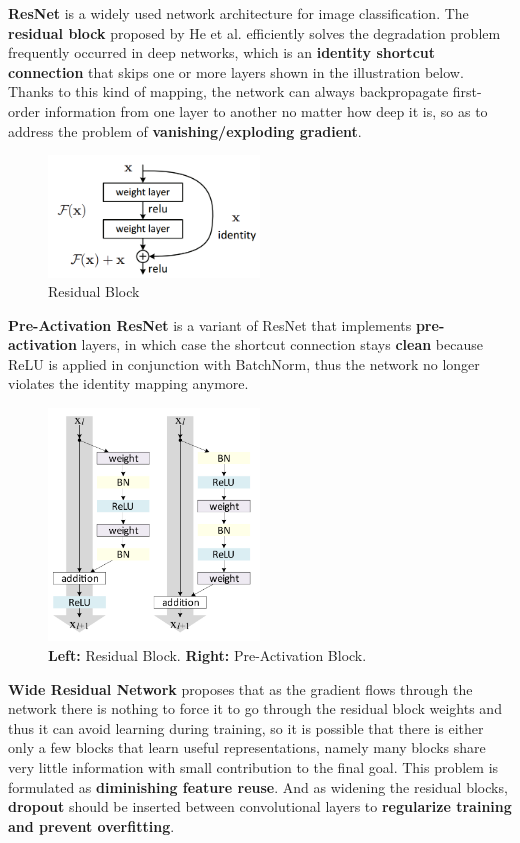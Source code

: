 \documentclass[a4paper, 11pt]{article} %
\begin{document}
\textbf{ResNet} is a widely used network architecture for image classification. The
\textbf{residual block} proposed by He et al. efficiently solves the degradation problem
frequently occurred in deep networks, which is an \textbf{identity shortcut connection} that
skips one or more layers shown in the illustration below. Thanks to this kind of mapping,
the network can always backpropagate first-order information from one layer to another no
matter how deep it is, so as to address the problem of \textbf{vanishing/exploding gradient}.

\begin{figure}[H]
	\centering
	\includegraphics[width=0.5\textwidth]{./img/residual-block.png}
	\caption{Residual Block}
\end{figure}

\textbf{Pre-Activation ResNet} is a variant of ResNet that implements \textbf{pre-activation}
layers, in which case the shortcut connection stays \textbf{clean} because ReLU is applied in
conjunction with BatchNorm, thus the network no longer violates the identity mapping anymore.

\begin{figure}[H]
	\centering
	\includegraphics[width=0.5\textwidth]{./img/preact.png}
	\caption{\textbf{Left:} Residual Block. \textbf{Right:} Pre-Activation Block.}
\end{figure}

\textbf{Wide Residual Network} proposes that as the gradient flows through the network there
is nothing to force it to go through the residual block weights and thus it can avoid learning
during training, so it is possible that there is either only a few blocks that learn useful
representations, namely many blocks share very little information with small contribution to
the final goal. This problem is formulated as \textbf{diminishing feature reuse}. And as
widening the residual blocks, \textbf{dropout} should be inserted between convolutional layers
to \textbf{regularize training and prevent overfitting}.
\end{document}
